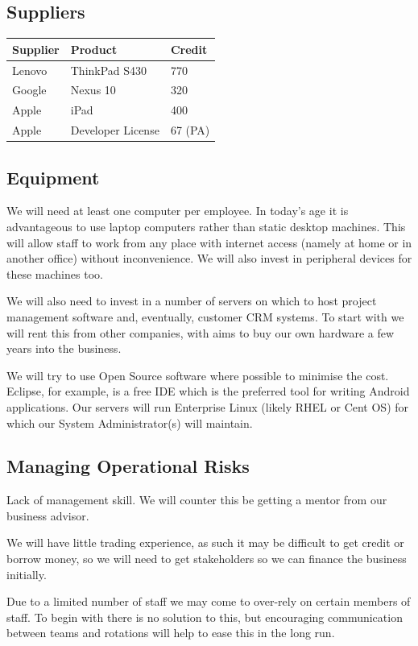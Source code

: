 \documentclass[DIV=calc, paper=a4, fontsize=11pt]{scrartcl}	 %
\begin{document}
\subsection{Suppliers}
\begin{tabular}{|l|l|l|} \hline
Supplier & Product       & Credit \\ \hline
Lenovo   & ThinkPad S430 & 770 \\ \hline
Google   & Nexus 10      & 320 \\ \hline
Apple    & iPad          & 400 \\ \hline
Apple    & Developer License & 67 (PA) \\ \hline
\end{tabular}

\subsection{Equipment}
We will need at least one computer per employee. In today's age it is advantageous to use laptop
computers rather than static desktop machines. This will allow staff to work from any place with
internet access (namely at home or in another office) without inconvenience. We will also invest
in peripheral devices for these machines too.

We will also need to invest in a number of servers on which to host project management software
and, eventually, customer CRM systems. To start with we will rent this from other companies, with
aims to buy our own hardware a few years into the business.

We will try to use Open Source software where possible to minimise the cost. Eclipse, for example,
is a free IDE which is the preferred tool for writing Android applications. Our servers will run
Enterprise Linux (likely RHEL or Cent OS) for which our System Administrator(s) will maintain. 

\subsection{Managing Operational Risks}
Lack of management skill. We will counter this be getting a mentor from our business advisor.

We will have little trading experience, as such it may be difficult to get credit or borrow money,
so we will need to get stakeholders so we can finance the business initially.

Due to a limited number of staff we may come to over-rely on certain members of staff. To begin
with there is no solution to this, but encouraging communication between teams and rotations will
help to ease this in the long run.
\end{document}
